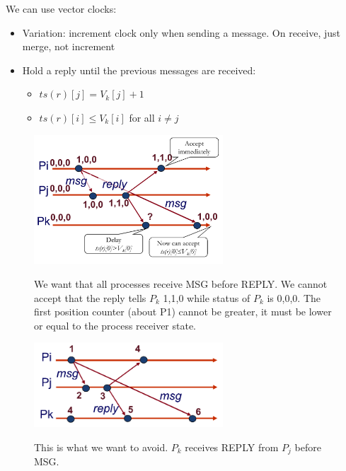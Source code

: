 \documentclass[10pt,a4paper]{article}
\begin{document}
We can use vector clocks:
\begin{itemize}
	\item Variation: increment clock only when sending a message. On receive, just merge, not increment
	\item Hold a reply until the previous messages are received:
	\begin{itemize}
		\item $ts(r)[j]=V_k[j]+1$
		\item $ts(r)[i] \leq V_k[i]$ for all $i \neq j$
	\end{itemize}
\end{itemize}
\begin{figure}[h!]
 \hfill \includegraphics[width=200pt]{images/vclocks-causal.png}\hspace*{\fill}
  \label{fig:vclocks-causal}
  \caption{We want that all processes receive MSG before REPLY. We cannot accept that the reply tells $P_k$ 1,1,0 while status of $P_k$ is 0,0,0. The first position counter (about P1) cannot be greater, it must be lower or equal to the process receiver state.}
\end{figure}
\begin{figure}[h!]
 \hfill \includegraphics[width=200pt]{images/vclocks.png}\hspace*{\fill}
  \label{fig:vclocks}
  \caption{This is what we want to avoid. $P_k$ receives REPLY from $P_j$ before MSG.}
\end{figure}
\end{document}
